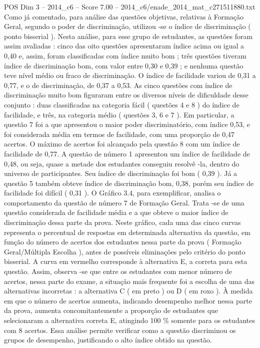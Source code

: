 \begin{textsample}{POS Dim 3 – 2014\_c6 – Score 7.00 – 2014\_c6/enade\_2014\_mat\_c271511880.txt}
Como já comentado, para análise das questões objetivas, relativas à Formação Geral, segundo o poder de discriminação, utilizou -se o índice de discriminação ( ponto bisserial ).
Nesta análise, para esse grupo de estudantes, as questões foram assim avaliadas : cinco das oito questões apresentaram índice acima ou igual a 0,40 e, assim, foram classificadas com índice muito bom ; três questões tiveram índice de discriminação bom, com valor entre 0,30 e 0,39 ; e nenhuma questão teve nível médio ou fraco de discriminação.
O índice de facilidade variou de 0,31 a 0,77, e o de discriminação, de 0,37 a 0,53.
As cinco questões com índice de discriminação muito bom figuraram entre os diversos níveis de dificuldade desse conjunto : duas classificadas na categoria fácil ( questões 4 e 8 ) do índice de facilidade, e três, na categoria médio ( questões 3, 6 e 7 ).
Em particular, a questão 7 foi a que apresentou o maior poder discriminatório, com índice 0,53, e foi considerada média em termos de facilidade, com uma proporção de 0,47 acertos.
O máximo de acertos foi alcançado pela questão 8 com um índice de facilidade de 0,77.
A questão de número 1 apresentou um índice de facilidade de 0,48, ou seja, quase a metade dos estudantes conseguiu resolvê -la, dentro do universo de participantes.
Seu índice de discriminação foi bom ( 0,39 ).
Já a questão 5 também obteve índice de discriminação bom, 0,38, porém seu índice de facilidade foi difícil ( 0,31 ).
O Gráfico 3.4, para exemplificar, analisa o comportamento da questão de número 7 de Formação Geral.
Trata -se de uma questão considerada de facilidade média e a que obteve o maior índice de discriminação dessa parte da prova.
Neste gráfico, cada uma das cinco curvas representa o percentual de respostas em determinada alternativa da questão, em função do número de acertos dos estudantes nessa parte da prova ( Formação Geral/Múltipla Escolha ), antes de possíveis eliminações pelo critério do ponto bisserial.
A curva em vermelho corresponde à alternativa E, a correta para esta questão.
Assim, observa -se que entre os estudantes com menor número de acertos, nessa parte do exame, a situação mais frequente foi a escolha de uma das alternativas incorretas : a alternativa C ( em preto ) ou D ( em roxo ).
À medida em que o número de acertos aumenta, indicando desempenho melhor nessa parte da prova, aumenta concomitantemente a proporção de estudantes que selecionaram a alternativa correta E, atingindo 100 \% somente para os estudantes com 8 acertos.
Essa análise permite verificar como a questão discriminou os grupos de desempenho, justificando o alto índice obtido na questão.

\end{textsample}
